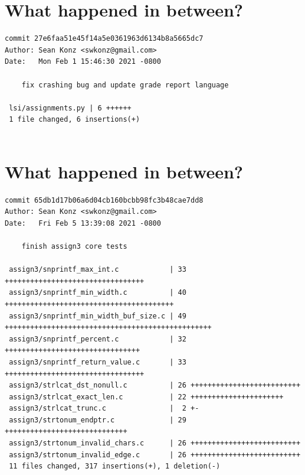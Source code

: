 \documentclass{article}
\begin{document}
\newpage

\section*{What happened in between?}
\vspace{2ex}
\begin{verbatim}
commit 27e6faa51e45f14a5e0361963d6134b8a5665dc7
Author: Sean Konz <swkonz@gmail.com>
Date:   Mon Feb 1 15:46:30 2021 -0800

    fix crashing bug and update grade report language

 lsi/assignments.py | 6 ++++++
 1 file changed, 6 insertions(+)


\end{verbatim}

\newpage

\section*{What happened in between?}
\vspace{2ex}
\begin{verbatim}
commit 65db1d17b06a6d04cb160bcbb98fc3b48cae7dd8
Author: Sean Konz <swkonz@gmail.com>
Date:   Fri Feb 5 13:39:08 2021 -0800

    finish assign3 core tests

 assign3/snprintf_max_int.c            | 33 +++++++++++++++++++++++++++++++++
 assign3/snprintf_min_width.c          | 40 ++++++++++++++++++++++++++++++++++++++++
 assign3/snprintf_min_width_buf_size.c | 49 +++++++++++++++++++++++++++++++++++++++++++++++++
 assign3/snprintf_percent.c            | 32 ++++++++++++++++++++++++++++++++
 assign3/snprintf_return_value.c       | 33 +++++++++++++++++++++++++++++++++
 assign3/strlcat_dst_nonull.c          | 26 ++++++++++++++++++++++++++
 assign3/strlcat_exact_len.c           | 22 ++++++++++++++++++++++
 assign3/strlcat_trunc.c               |  2 +-
 assign3/strtonum_endptr.c             | 29 +++++++++++++++++++++++++++++
 assign3/strtonum_invalid_chars.c      | 26 ++++++++++++++++++++++++++
 assign3/strtonum_invalid_edge.c       | 26 ++++++++++++++++++++++++++
 11 files changed, 317 insertions(+), 1 deletion(-)

\end{verbatim}

\newpage
\end{document}
